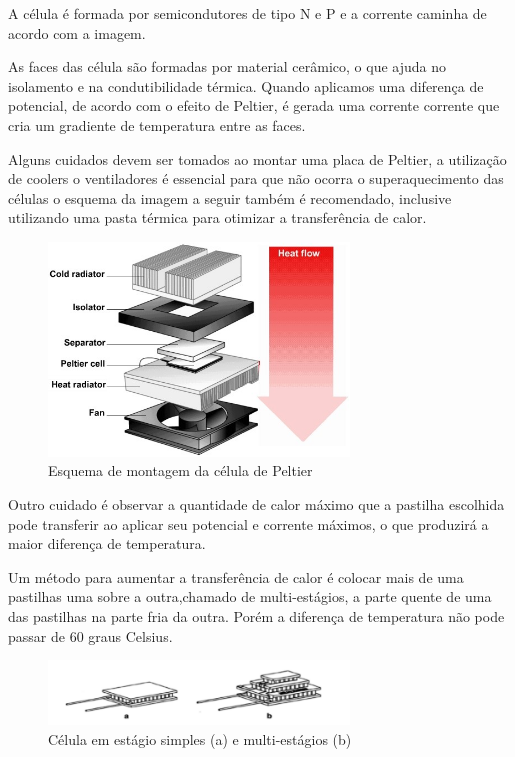 A célula é formada por semicondutores de tipo N e P e a corrente caminha de acordo com a imagem.

As faces das célula são formadas por material cerâmico, o que ajuda no isolamento e na condutibilidade térmica. Quando aplicamos uma diferença de potencial, de acordo com o efeito de Peltier, é gerada uma corrente corrente que cria um gradiente de temperatura entre as faces.

Alguns cuidados devem ser tomados ao montar uma placa de Peltier, a utilização de coolers o ventiladores é essencial para que não ocorra o superaquecimento das células o esquema da imagem a seguir também é recomendado, inclusive utilizando uma pasta térmica para otimizar a transferência de calor.

\begin{figure}[H]
\centering
\includegraphics[width=8cm]{figuras/peltier2.jpg}
\caption{Esquema de montagem da célula de Peltier}
\end{figure}

Outro cuidado é observar a quantidade de calor máximo que a pastilha escolhida pode transferir ao aplicar seu potencial e corrente máximos, o que produzirá a maior diferença de temperatura. 

Um método para aumentar a transferência de calor é colocar mais de uma pastilhas uma sobre a outra,chamado de multi-estágios, a parte quente de uma das pastilhas na parte fria da outra. Porém a diferença de temperatura não pode passar de 60 graus Celsius.

\begin{figure}[H]
\centering
\includegraphics[width=8cm]{figuras/peltier3.png}
\caption{Célula em estágio simples (a) e multi-estágios (b)}
\end{figure}

